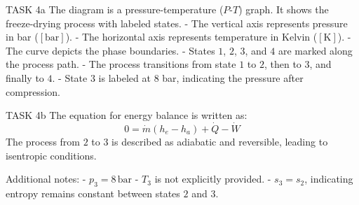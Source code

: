 TASK 4a  
The diagram is a pressure-temperature (\(P\)-\(T\)) graph. It shows the freeze-drying process with labeled states.  
- The vertical axis represents pressure in bar (\([ \text{bar} ]\)).  
- The horizontal axis represents temperature in Kelvin (\([ \text{K} ]\)).  
- The curve depicts the phase boundaries.  
- States \(1\), \(2\), \(3\), and \(4\) are marked along the process path.  
- The process transitions from state \(1\) to \(2\), then to \(3\), and finally to \(4\).  
- State \(3\) is labeled at 8 bar, indicating the pressure after compression.  

TASK 4b  
The equation for energy balance is written as:  
\[
0 = \dot{m} (h_e - h_a) + \dot{Q} - \dot{W}
\]  
The process from \(2\) to \(3\) is described as adiabatic and reversible, leading to isentropic conditions.  

Additional notes:  
- \(p_3 = 8 \, \text{bar}\)  
- \(T_3\) is not explicitly provided.  
- \(s_3 = s_2\), indicating entropy remains constant between states \(2\) and \(3\).  